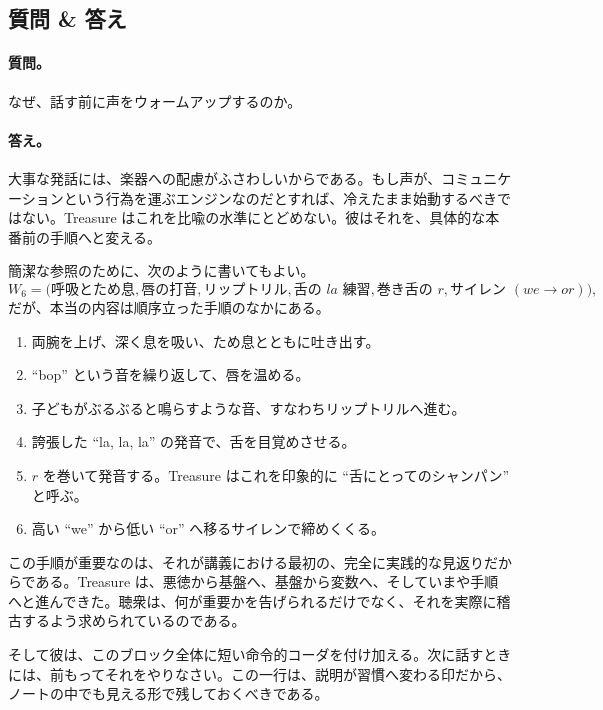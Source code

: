 \subsection{質問 \& 答え}

\paragraph{質問。} なぜ、話す前に声をウォームアップするのか。

\paragraph{答え。} 大事な発話には、楽器への配慮がふさわしいからである。もし声が、コミュニケーションという行為を運ぶエンジンなのだとすれば、冷えたまま始動するべきではない。Treasure はこれを比喩の水準にとどめない。彼はそれを、具体的な本番前の手順へと変える。

簡潔な参照のために、次のように書いてもよい。
\begin{equation}
W_6=
\bigl(
\text{呼吸とため息},
\text{唇の打音},
\text{リップトリル},
\text{舌の } la\text{ 練習},
\text{巻き舌の } r,
\text{サイレン } (we \to or)
\bigr),
\end{equation}
だが、本当の内容は順序立った手順のなかにある。
\begin{enumerate}
\item 両腕を上げ、深く息を吸い、ため息とともに吐き出す。
\item ``bop'' という音を繰り返して、唇を温める。
\item 子どもがぶるぶると鳴らすような音、すなわちリップトリルへ進む。
\item 誇張した ``la, la, la'' の発音で、舌を目覚めさせる。
\item \(r\) を巻いて発音する。Treasure はこれを印象的に ``舌にとってのシャンパン'' と呼ぶ。
\item 高い ``we'' から低い ``or'' へ移るサイレンで締めくくる。
\end{enumerate}

この手順が重要なのは、それが講義における最初の、完全に実践的な見返りだからである。Treasure は、悪徳から基盤へ、基盤から変数へ、そしていまや手順へと進んできた。聴衆は、何が重要かを告げられるだけでなく、それを実際に稽古するよう求められているのである。

そして彼は、このブロック全体に短い命令的コーダを付け加える。次に話すときには、前もってそれをやりなさい。この一行は、説明が習慣へ変わる印だから、ノートの中でも見える形で残しておくべきである。

